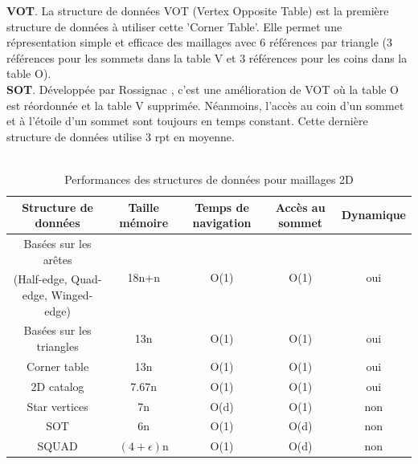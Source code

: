 \documentclass[a4paper,11pt,openany]{article}
\begin{document}
\noindent
\textbf{VOT}. La structure de données VOT (Vertex Opposite Table) est la première structure de données à utiliser cette 'Corner Table'. Elle permet une répresentation simple et efficace des maillages avec 6 références par triangle (3 références pour les sommets dans la table V et 3 références pour les coins dans la table O).\\
\textbf{SOT}. Développée par Rossignac \cite{SOT}, c'est une amélioration de VOT où la table O est réordonnée et la table V supprimée. Néanmoins, l'accès au coin d'un sommet et à l'étoile d'un sommet sont toujours en temps constant. Cette dernière structure de données utilise 3 rpt en moyenne.\\\\

\begin{table}[H]
\footnotesize
\begin{tabular}{|c | c | c | c | c|}
\hline
Structure de données & Taille mémoire & Temps de navigation & Accès au sommet & Dynamique\\
\hline
Basées sur les arêtes & \multirow{2}{*}{18n+n} & \multirow{2}{*}{O(1)} & \multirow{2}{*}{O(1)} &\multirow{2}{*}{oui}\\
(Half-edge, Quad-edge, Winged-edge)&&&&\\
Basées sur les triangles & 13n & O(1) & O(1) & oui\\		
Corner table & 13n & O(1) & O(1) & oui\\
\hline
2D catalog \cite{2d_catalog}& 7.67n & O(1) & O(1) & oui\\
\hline
Star vertices \cite{star_vertices} & 7n & O(d) & O(1) & non\\		
SOT \cite{SOT}& 6n & O(1) & O(d) & non\\
SQUAD \cite{squad}& $(4+\epsilon)$n & O(1) & O(d) & non\\
\hline  
\end{tabular}
\caption{Performances des structures de données pour maillages 2D}
\end{table}

\normalsize
\end{document}
